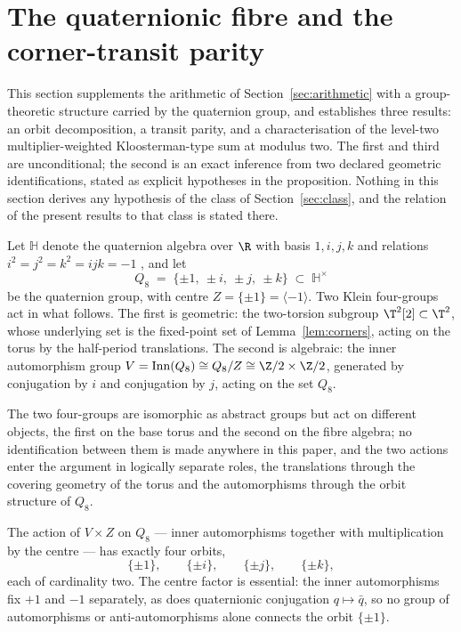 \section{The quaternionic fibre and the corner-transit parity}\label{sec:parity}

This section supplements the arithmetic of
Section~\ref{sec:arithmetic} with a group-theoretic structure carried
by the quaternion group, and establishes three results: an orbit
decomposition, a transit parity, and a characterisation of the
level-two multiplier-weighted Kloosterman-type sum at modulus two.
The first and third are unconditional; the second is an exact
inference from two declared geometric identifications, stated as
explicit hypotheses in the proposition. Nothing in this section
derives any hypothesis of the class of Section~\ref{sec:class}, and
the relation of the present results to that class is stated there.

\begin{definition}\label{def:fibrealg}
Let $\mathbb{H}$ denote the quaternion algebra over $\R$ with basis
$1, i, j, k$ and relations $i^2 = j^2 = k^2 = ijk = -1$
\cite{ConwaySmith}, and let
\[
Q_8 \;=\; \{\pm 1,\ \pm i,\ \pm j,\ \pm k\} \;\subset\;
\mathbb{H}^{\times}
\]
be the quaternion group, with centre $Z = \{\pm 1\} = \langle -1
\rangle$. Two Klein four-groups act in what follows. The first is
geometric: the two-torsion subgroup $\T^2[2] \subset \T^2$, whose
underlying set is the fixed-point set of Lemma~\ref{lem:corners},
acting on the torus by the half-period translations. The second is
algebraic: the inner automorphism group
$V = \mathrm{Inn}(Q_8) \cong Q_8/Z \cong \Z/2 \times \Z/2$,
generated by conjugation by $i$ and conjugation by $j$, acting on
the set $Q_8$.
\end{definition}

The two four-groups are isomorphic as abstract groups but act on
different objects, the first on the base torus and the second on the
fibre algebra; no identification between them is made anywhere in
this paper, and the two actions enter the argument in logically
separate roles, the translations through the covering geometry of
the torus and the automorphisms through the orbit structure of
$Q_8$.

\begin{lemma}\label{lem:orbits}
The action of $V \times Z$ on $Q_8$ --- inner automorphisms together
with multiplication by the centre --- has exactly four orbits,
\[
\{\pm 1\}, \qquad \{\pm i\}, \qquad \{\pm j\}, \qquad \{\pm k\},
\]
each of cardinality two. The centre factor is essential: the inner
automorphisms fix $+1$ and $-1$ separately, as does quaternionic
conjugation $q \mapsto \bar q$, so no group of automorphisms or
anti-automorphisms alone connects the orbit $\{\pm 1\}$.
\end{lemma}

